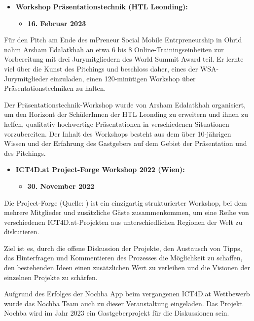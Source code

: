 \begin{itemize}
    \item \textbf{Workshop Präsentationstechnik (HTL Leonding):}
          \begin{itemize}
              \item \textbf{16. Februar 2023}
          \end{itemize}
\end{itemize}

Für den Pitch am Ende des mPreneur Social Mobile Entrpreneurship in Ohrid nahm Arsham Edalatkhah an etwa 6 bis 8 Online-Trainingseinheiten zur Vorbereitung mit drei Jurymitgliedern des World Summit Award teil. Er lernte viel über die Kunst des Pitchings und beschloss daher, eines der WSA-Jurymitglieder einzuladen, einen 120-minütigen Workshop über Präsentationstechniken zu halten.

Der Präsentationstechnik-Workshop wurde von Arsham Edalatkhah organisiert, um den Horizont der SchülerInnen der HTL Leonding zu erweitern und ihnen zu helfen, qualitativ hochwertige Präsentationen in verschiedenen Situationen vorzubereiten. Der Inhalt des Workshops besteht aus dem über 10-jährigen Wissen und der Erfahrung des Gastgebers auf dem Gebiet der Präsentation und des Pitchings.

\begin{itemize}
    \item \textbf{ICT4D.at Project-Forge Workshop 2022 (Wien):}
          \begin{itemize}
              \item \textbf{30. November 2022}
          \end{itemize}
\end{itemize}

Die Project-Forge (Quelle: \cite{ict4d-project-forge-report} ) ist ein einzigartig strukturierter Workshop, bei dem mehrere Mitglieder und zusätzliche Gäste zusammenkommen, um eine Reihe von verschiedenen ICT4D.at-Projekten aus unterschiedlichen Regionen der Welt zu diskutieren.

Ziel ist es, durch die offene Diskussion der Projekte, den Austausch von Tipps, das Hinterfragen und Kommentieren des Prozesses die Möglichkeit zu schaffen, den bestehenden Ideen einen zusätzlichen Wert zu verleihen und die Visionen der einzelnen Projekte zu schärfen.

Aufgrund des Erfolges der Nochba App beim vergangenen ICT4D.at Wettbewerb wurde das Nochba Team auch zu dieser Veranstaltung eingeladen. Das Projekt Nochba wird im Jahr 2023 ein Gastgeberprojekt für die Diskussionen sein.

